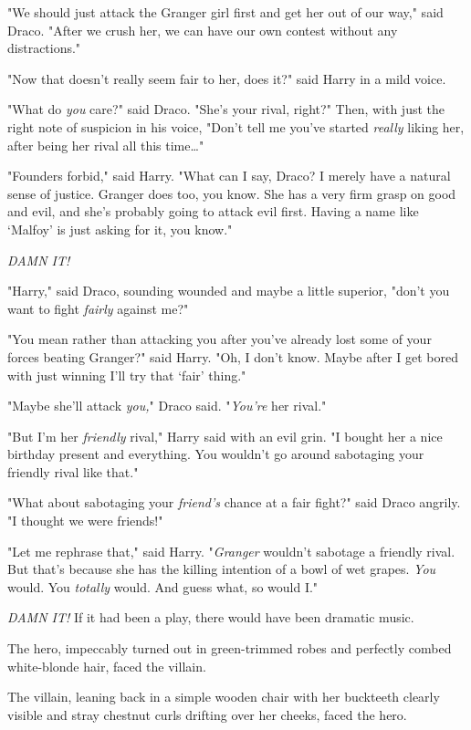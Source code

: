 "We should just attack the Granger girl first and get her out of our way," said
Draco. "After we crush her, we can have our own contest without any
distractions."

"Now that doesn't really seem fair to her, does it?" said Harry in a mild voice.

"What do \emph{you} care?" said Draco. "She's your rival, right?" Then, with
just the right note of suspicion in his voice, "Don't tell me you've started
\emph{really} liking her, after being her rival all this time{\ldots}"

"Founders forbid," said Harry. "What can I say, Draco? I merely have a natural
sense of justice. Granger does too, you know. She has a very firm grasp on good
and evil, and she's probably going to attack evil first. Having a name like
`Malfoy' is just asking for it, you know."

\emph{DAMN IT!}

"Harry," said Draco, sounding wounded and maybe a little superior, "don't you
want to fight \emph{fairly} against me?"

"You mean rather than attacking you after you've already lost some of your
forces beating Granger?" said Harry. "Oh, I don't know. Maybe after I get bored
with just winning I'll try that `fair' thing."

"Maybe she'll attack \emph{you,}" Draco said. "\emph{You're} her rival."

"But I'm her \emph{friendly} rival," Harry said with an evil grin. "I bought
her a nice birthday present and everything. You wouldn't go around sabotaging
your friendly rival like that."

"What about sabotaging your \emph{friend's} chance at a fair fight?" said Draco
angrily. "I thought we were friends!"

"Let me rephrase that," said Harry. "\emph{Granger} wouldn't sabotage a
friendly rival. But that's because she has the killing intention of a bowl of
wet grapes. \emph{You} would. You \emph{totally} would. And guess what, so
would I."

\emph{DAMN IT!}
\later
If it had been a play, there would have been dramatic music.

The hero, impeccably turned out in green-trimmed robes and perfectly combed
white-blonde hair, faced the villain.

The villain, leaning back in a simple wooden chair with her buckteeth clearly
visible and stray chestnut curls drifting over her cheeks, faced the hero.

